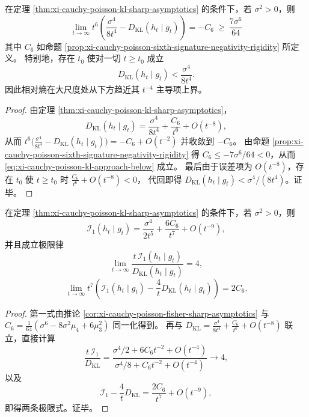 \begin{corollary}[六阶系数负号导致的主项上界与从下趋近]\label{cor:xi-cauchy-poisson-kl-approach-below}
在定理 \ref{thm:xi-cauchy-poisson-kl-sharp-asymptotics} 的条件下，若 \(\sigma^2>0\)，则
\begin{equation}\label{eq:xi-cauchy-poisson-kl-approach-below}
\boxed{\;
\lim_{t\to\infty} t^6\left(\frac{\sigma^4}{8t^4}-D_{\mathrm{KL}}(h_t\mid g_t)\right)
=-C_6\ \ge\ \frac{7\sigma^6}{64}\; }
\end{equation}
其中 \(C_6\) 如命题 \ref{prop:xi-cauchy-poisson-sixth-signature-negativity-rigidity} 所定义。
特别地，存在 \(t_0\) 使对一切 \(t\ge t_0\) 成立
\[
D_{\mathrm{KL}}(h_t\mid g_t)<\frac{\sigma^4}{8t^4}.
\]
因此相对熵在大尺度处从下方趋近其 \(t^{-4}\) 主导项上界。
\end{corollary}
\begin{proof}
由定理 \ref{thm:xi-cauchy-poisson-kl-sharp-asymptotics}，
\[
D_{\mathrm{KL}}(h_t\mid g_t)=\frac{\sigma^4}{8t^4}+\frac{C_6}{t^6}+O(t^{-8}),
\]
从而
\(
t^6\bigl(\frac{\sigma^4}{8t^4}-D_{\mathrm{KL}}(h_t\mid g_t)\bigr)=-C_6+O(t^{-2})
\)
并收敛到 \(-C_6\)。
由命题 \ref{prop:xi-cauchy-poisson-sixth-signature-negativity-rigidity} 得 \(C_6\le -7\sigma^6/64<0\)，从而 \eqref{eq:xi-cauchy-poisson-kl-approach-below} 成立。
最后由于误差项为 \(O(t^{-8})\)，存在 \(t_0\) 使 \(t\ge t_0\) 时
\(
\frac{C_6}{t^6}+O(t^{-8})<0
\)，
代回即得 \(D_{\mathrm{KL}}(h_t\mid g_t)<\sigma^4/(8t^4)\)。证毕。
\end{proof}

\begin{corollary}[耗散--熵比值的自相似极限与二阶缺陷]\label{cor:xi-cauchy-poisson-fisher-kl-selfsimilar-defect}
在定理 \ref{thm:xi-cauchy-poisson-kl-sharp-asymptotics} 的条件下，若 \(\sigma^2>0\)，则
\[
\mathcal I_1(h_t\mid g_t)
=\frac{\sigma^4}{2t^5}+\frac{6C_6}{t^7}+O(t^{-9}),
\]
并且成立极限律
\[
\lim_{t\to\infty}\frac{t\,\mathcal I_1(h_t\mid g_t)}{D_{\mathrm{KL}}(h_t\mid g_t)}=4,
\]
\[
\lim_{t\to\infty}t^7\!\left(
\mathcal I_1(h_t\mid g_t)-\frac{4}{t}D_{\mathrm{KL}}(h_t\mid g_t)
\right)=2C_6.
\]
\end{corollary}
\begin{proof}
第一式由推论 \ref{cor:xi-cauchy-poisson-fisher-sharp-asymptotics} 与
\(
C_6=\frac{1}{64}(\sigma^6-8\sigma^2\mu_4+6\mu_3^2)
\)
同一化得到。
再与
\(
D_{\mathrm{KL}}=\frac{\sigma^4}{8t^4}+\frac{C_6}{t^6}+O(t^{-8})
\)
联立，直接计算
\[
\frac{t\,\mathcal I_1}{D_{\mathrm{KL}}}
=\frac{\sigma^4/2+6C_6t^{-2}+O(t^{-4})}{\sigma^4/8+C_6t^{-2}+O(t^{-4})}\to 4,
\]
以及
\[
\mathcal I_1-\frac{4}{t}D_{\mathrm{KL}}
=\frac{2C_6}{t^7}+O(t^{-9}),
\]
即得两条极限式。证毕。
\end{proof}


